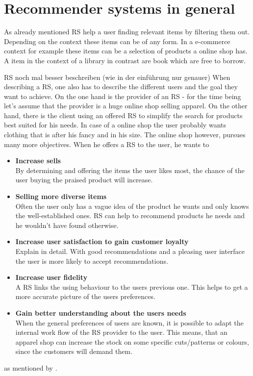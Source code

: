 

\section{Recommender systems in general}
As already mentioned RS help a user finding relevant items by filtering them out.
Depending on the context these items can be of any form.
In a e-commerce context for example these items can be a selection of products a online shop has.
A item in the context of a library in contrast are book which are free to borrow.
\citep[p.~377-378]{burke:2007}

{\color{red}RS noch mal besser beschreiben (wie in der einf\"uhrung nur genauer)}
When describing a RS, one also has to describe the different users and the goal they want to achieve.
On the one hand is the provider of an RS - for the time being let's assume that the provider is a huge online shop selling apparel.
On the other hand, there is the client using an offered RS to simplify the search for products best suited for his needs.
In case of a online shop the user probably wants clothing that is after his fancy and in his size.
The online shop however, pursues many more objectives.
When he offers a RS to the user, he wants to
\begin{itemize}
    \item\textbf{Increase sells}\hfill\\
        By determining and offering the items the user likes most, the chance of the user buying the praised product will increase.
    \item\textbf{Selling more diverse items}\hfill\\
        Often the user only has a vague idea of the product he wants and only knows the well-established ones.
        RS can help to recommend products he needs and he wouldn't have found otherwise.
    \item\textbf{Increase user satisfaction to gain customer loyalty}\hfill\\
        {\color{red} Explain in detail.}
        With good recommendations and a pleasing user interface the user is more likely to accept recommendations.
    \item\textbf{Increase user fidelity}\hfill\\
        A RS links the using behaviour to the users previous one.
        This helps to get a more accurate picture of the users preferences.
    \item\textbf{Gain better understanding about the users needs}\hfill\\
        When the general preferences of users are known, it is possible to adapt the internal work flow of the RS provider to the user.
        This means, that an apparel shop can increase the stock on some specific cuts/patterns or colours, since the customers will demand them.
\end{itemize}
as mentioned by \citeauthor{ricci:2011}.\citep[p.~4-5]{ricci:2011}
\\

